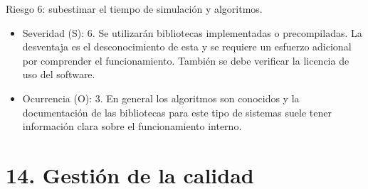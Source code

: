 \documentclass[
11pt, %
]{charter}
\begin{document}
Riesgo 6:  subestimar el tiempo de simulación y algoritmos. 
\begin{itemize}
	\item Severidad (S): 6.
	\newline Se utilizarán bibliotecas implementadas o precompiladas. La desventaja es el desconocimiento de esta y se requiere un esfuerzo adicional por comprender el funcionamiento. También se debe verificar la licencia de uso del software. 
	\item Ocurrencia (O): 3.\newline 
	En general los algoritmos son conocidos y la documentación de las bibliotecas para este tipo de sistemas suele tener información clara sobre el funcionamiento interno. 
\end{itemize}




\section{14. Gestión de la calidad}
\label{sec:calidad}
\end{document}
